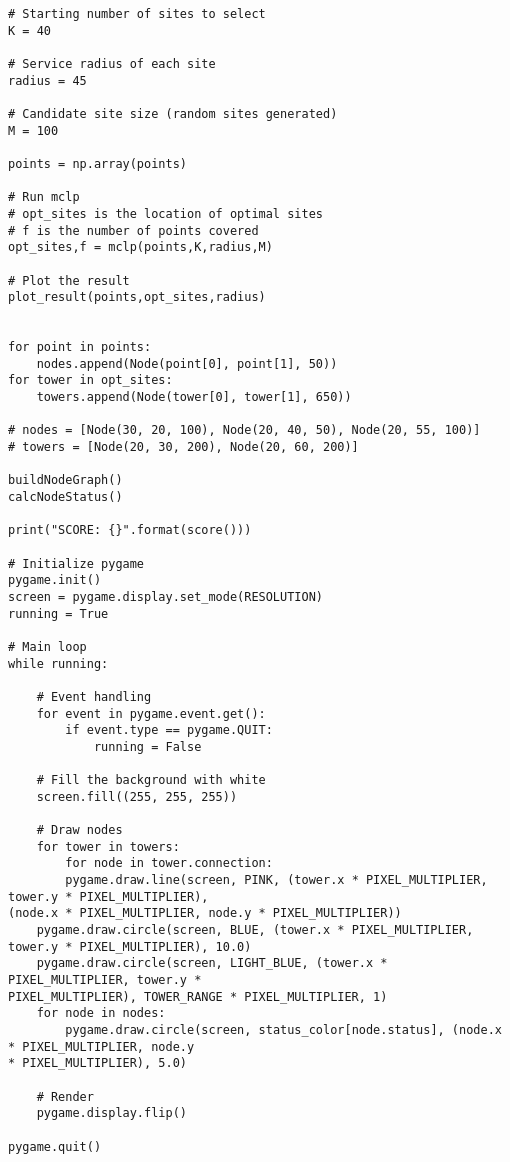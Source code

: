 \begin{singlespace}
\begin{verbatim}
# Starting number of sites to select
K = 40
 
# Service radius of each site
radius = 45
 
# Candidate site size (random sites generated)
M = 100
 
points = np.array(points)
 
# Run mclp 
# opt_sites is the location of optimal sites 
# f is the number of points covered
opt_sites,f = mclp(points,K,radius,M)
 
# Plot the result 
plot_result(points,opt_sites,radius)

 
for point in points:
    nodes.append(Node(point[0], point[1], 50))
for tower in opt_sites:
    towers.append(Node(tower[0], tower[1], 650))
 
# nodes = [Node(30, 20, 100), Node(20, 40, 50), Node(20, 55, 100)]
# towers = [Node(20, 30, 200), Node(20, 60, 200)]
 
buildNodeGraph()
calcNodeStatus()
 
print("SCORE: {}".format(score()))
 
# Initialize pygame
pygame.init()
screen = pygame.display.set_mode(RESOLUTION)
running = True
 
# Main loop
while running:
 
    # Event handling
    for event in pygame.event.get():
        if event.type == pygame.QUIT:
            running = False
 
    # Fill the background with white
    screen.fill((255, 255, 255))
 
    # Draw nodes
    for tower in towers:
    	for node in tower.connection:
    	pygame.draw.line(screen, PINK, (tower.x * PIXEL_MULTIPLIER, tower.y * PIXEL_MULTIPLIER), 
(node.x * PIXEL_MULTIPLIER, node.y * PIXEL_MULTIPLIER))
    pygame.draw.circle(screen, BLUE, (tower.x * PIXEL_MULTIPLIER, tower.y * PIXEL_MULTIPLIER), 10.0)
    pygame.draw.circle(screen, LIGHT_BLUE, (tower.x * PIXEL_MULTIPLIER, tower.y * 
PIXEL_MULTIPLIER), TOWER_RANGE * PIXEL_MULTIPLIER, 1)
    for node in nodes:
        pygame.draw.circle(screen, status_color[node.status], (node.x * PIXEL_MULTIPLIER, node.y 
* PIXEL_MULTIPLIER), 5.0)
    
    # Render
    pygame.display.flip()
 
pygame.quit()
 
	\end{verbatim}
	\end{singlespace}

